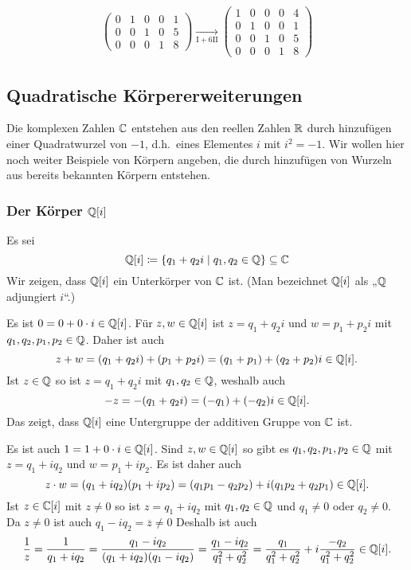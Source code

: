 \begin{bsp}
\begin{enumerate}[leftmargin=*]
\begin{align*}
\begin{pmatrix}
     0 & 1 & 0 & 0 & 1 \\
     0 & 0 & 1 & 0 & 5 \\
     0 & 0 & 0 & 1 & 8
    \end{pmatrix}
    \xrightarrow[\mathrm{I}+6\mathrm{II}]{}
    \begin{pmatrix}
     1 & 0 & 0 & 0 & 4 \\
     0 & 1 & 0 & 0 & 1 \\
     0 & 0 & 1 & 0 & 5 \\
     0 & 0 & 0 & 1 & 8
    \end{pmatrix}
   \end{align*}  
 \end{enumerate}
\end{bsp}
 




\subsection{Quadratische Körpererweiterungen}
Die komplexen Zahlen $\mathbb{C}$ entstehen aus den reellen Zahlen $\mathbb{R}$ durch hinzufügen einer Quadratwurzel von $-1$, d.h.\ eines Elementes $i$ mit $i^2 = -1$. Wir wollen hier noch weiter Beispiele von Körpern angeben, die durch hinzufügen von Wurzeln aus bereits bekannten Körpern entstehen.


\subsubsection{Der Körper \texorpdfstring{$\mathbb{Q}[i]$}{Q[i]}}
Es sei
\[
 \mathbb{Q}[i]
 \coloneqq
 \{ q_1 + q_2 i \mid q_1, q_2 \in \mathbb{Q} \}
 \subseteq \mathbb{C}
\]
Wir zeigen, dass $\mathbb{Q}[i]$ ein Unterkörper von $\mathbb{C}$ ist. (Man bezeichnet $\mathbb{Q}[i]$ als „$\mathbb{Q}$ adjungiert $i$“.)

Es ist $0 = 0 + 0 \cdot i \in \mathbb{Q}[i]$. Für $z,w \in \mathbb{Q}[i]$ ist $z = q_1 + q_2 i$ und $w = p_1 + p_2 i$ mit $q_1, q_2, p_1, p_2 \in \mathbb{Q}$. Daher ist auch
\[
 z + w
 = (q_1 + q_2 i) + (p_1 + p_2 i)
 = (q_1 + p_1) + (q_2 + p_2) i
 \in \mathbb{Q}[i].
\]
Ist $z \in \mathbb{Q}$ so ist $z = q_1 + q_2 i$ mit $q_1, q_2 \in \mathbb{Q}$, weshalb auch
\[
 -z = -(q_1 + q_2 i) = (-q_1) + (-q_2) i \in \mathbb{Q}[i].
\]
Das zeigt, dass $\mathbb{Q}[i]$ eine Untergruppe der additiven Gruppe von $\mathbb{C}$ ist.

Es ist auch $1 = 1 + 0 \cdot i \in \mathbb{Q}[i]$. Sind $z, w \in \mathbb{Q}[i]$ so gibt es $q_1, q_2, p_1, p_2 \in \mathbb{Q}$ mit $z = q_1 + i q_2$ und $w = p_1 + i p_2$. Es ist daher auch
\[
 z \cdot w
 = (q_1 + iq_2)(p_1 + ip_2)
 = (q_1 p_1 - q_2 p_2) + i(q_1 p_2 + q_2 p_1)
 \in \mathbb{Q}[i].
\]
Ist $z \in \mathbb{C}[i]$ mit $z \neq 0$ so ist $z = q_1 + i q_2$ mit $q_1, q_2 \in \mathbb{Q}$ und $q_1 \neq 0$ oder $q_2 \neq 0$. Da $z \neq 0$ ist auch $q_1 - i q_2 = \overline{z} \neq 0$ Deshalb ist auch
\[
 \frac{1}{z}
 = \frac{1}{q_1 + i q_2}
 = \frac{q_1 - i q_2}{(q_1 + i q_2)(q_1 - i q_2)}
 = \frac{q_1 - i q_2}{q_1^2 + q_2^2}
 = \frac{q_1}{q_1^2 + q_2^2} + i \frac{-q_2}{q_1^2+q_2^2}
 \in \mathbb{Q}[i].
\]

